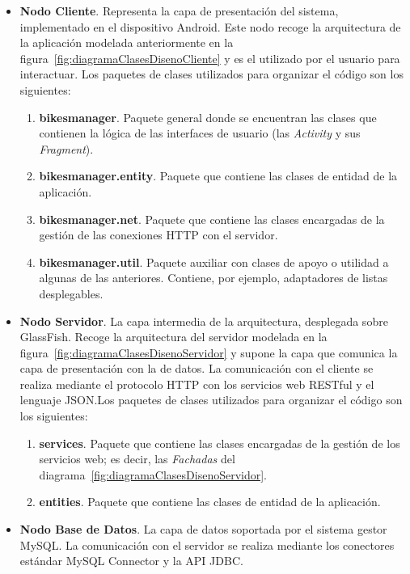 \begin{itemize}
	\item \textbf{Nodo Cliente}. Representa la capa de presentación del sistema, implementado en el dispositivo Android. Este nodo recoge la arquitectura de la aplicación modelada anteriormente en la figura~\ref{fig:diagramaClasesDisenoCliente} y es el utilizado por el usuario para interactuar. Los paquetes de clases utilizados para organizar el código son los siguientes:
	\begin{enumerate}
		\item \textbf{bikesmanager}. Paquete general donde se encuentran las clases que contienen la lógica de las interfaces de usuario (las \emph{Activity} y sus \emph{Fragment}).
		\item \textbf{bikesmanager.entity}. Paquete que contiene las clases de entidad de la aplicación.
		\item \textbf{bikesmanager.net}. Paquete que contiene las clases encargadas de la gestión de las conexiones HTTP con el servidor.
		\item \textbf{bikesmanager.util}. Paquete auxiliar con clases de apoyo o utilidad a algunas de las anteriores. Contiene, por ejemplo, adaptadores de listas desplegables.
	\end{enumerate}
	\item \textbf{Nodo Servidor}. La capa intermedia de la arquitectura, desplegada sobre GlassFish. Recoge la arquitectura del servidor modelada en la figura~\ref{fig:diagramaClasesDisenoServidor} y supone la capa que comunica la capa de presentación con la de datos. La comunicación con el cliente se realiza mediante el protocolo HTTP con los servicios web RESTful y el lenguaje JSON.Los paquetes de clases utilizados para organizar el código son los siguientes:
	\begin{enumerate}
		\item \textbf{services}. Paquete que contiene las clases encargadas de la gestión de los servicios web; es decir, las \emph{Fachadas} del diagrama~\ref{fig:diagramaClasesDisenoServidor}.
		\item \textbf{entities}. Paquete que contiene las clases de entidad de la aplicación.
	\end{enumerate}
	\item \textbf{Nodo Base de Datos}. La capa de datos soportada por el sistema gestor MySQL. La comunicación con el servidor se realiza mediante los conectores estándar MySQL Connector y la API JDBC.
\end{itemize}
